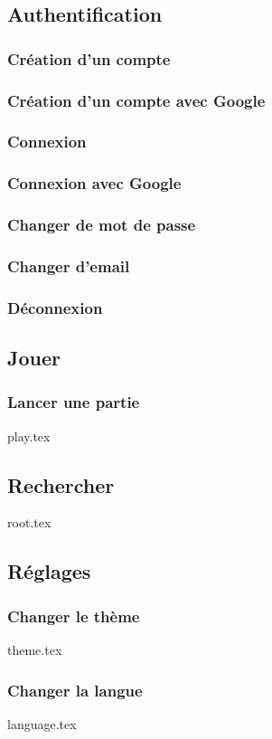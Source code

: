 \subsection{Authentification}
\subsubsection{Création d'un compte}
\subsubsection{Création d'un compte avec Google}
\subsubsection{Connexion}
\subsubsection{Connexion avec Google}
\subsubsection{Changer de mot de passe}
\subsubsection{Changer d'email}
\subsubsection{Déconnexion}

\subsection{Jouer}
\subsubsection{Lancer une partie}
{play.tex}

\subsection{Rechercher}
{root.tex}

\subsection{Réglages}
\subsubsection{Changer le thème}
{theme.tex}

\subsubsection{Changer la langue}
{language.tex}